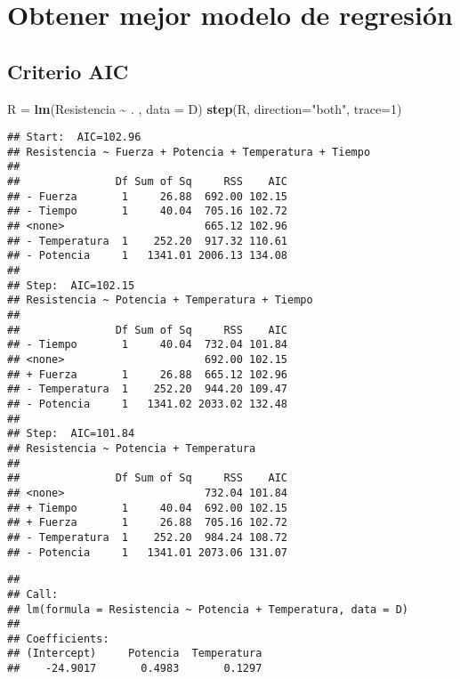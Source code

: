 \documentclass[
]{article}
\newenvironment{Shaded}{\begin{snugshade}}{\end{snugshade}}
\newcommand{\AttributeTok}[1]{\textcolor[rgb]{0.13,0.29,0.53}{#1}}
\newcommand{\DecValTok}[1]{\textcolor[rgb]{0.00,0.00,0.81}{#1}}
\newcommand{\FunctionTok}[1]{\textcolor[rgb]{0.13,0.29,0.53}{\textbf{#1}}}
\newcommand{\NormalTok}[1]{#1}
\newcommand{\OtherTok}[1]{\textcolor[rgb]{0.56,0.35,0.01}{#1}}
\newcommand{\SpecialCharTok}[1]{\textcolor[rgb]{0.81,0.36,0.00}{\textbf{#1}}}
\newcommand{\StringTok}[1]{\textcolor[rgb]{0.31,0.60,0.02}{#1}}
\begin{document}
\section{Obtener mejor modelo de
regresión}\label{obtener-mejor-modelo-de-regresiuxf3n}

\subsection{Criterio AIC}\label{criterio-aic}

\begin{Shaded}
\begin{Highlighting}[]
\NormalTok{R }\OtherTok{=} \FunctionTok{lm}\NormalTok{(Resistencia }\SpecialCharTok{\textasciitilde{}}\NormalTok{ . , }\AttributeTok{data =}\NormalTok{ D)}
\FunctionTok{step}\NormalTok{(R, }\AttributeTok{direction=}\StringTok{"both"}\NormalTok{, }\AttributeTok{trace=}\DecValTok{1}\NormalTok{)}
\end{Highlighting}
\end{Shaded}

\begin{verbatim}
## Start:  AIC=102.96
## Resistencia ~ Fuerza + Potencia + Temperatura + Tiempo
## 
##               Df Sum of Sq     RSS    AIC
## - Fuerza       1     26.88  692.00 102.15
## - Tiempo       1     40.04  705.16 102.72
## <none>                      665.12 102.96
## - Temperatura  1    252.20  917.32 110.61
## - Potencia     1   1341.01 2006.13 134.08
## 
## Step:  AIC=102.15
## Resistencia ~ Potencia + Temperatura + Tiempo
## 
##               Df Sum of Sq     RSS    AIC
## - Tiempo       1     40.04  732.04 101.84
## <none>                      692.00 102.15
## + Fuerza       1     26.88  665.12 102.96
## - Temperatura  1    252.20  944.20 109.47
## - Potencia     1   1341.02 2033.02 132.48
## 
## Step:  AIC=101.84
## Resistencia ~ Potencia + Temperatura
## 
##               Df Sum of Sq     RSS    AIC
## <none>                      732.04 101.84
## + Tiempo       1     40.04  692.00 102.15
## + Fuerza       1     26.88  705.16 102.72
## - Temperatura  1    252.20  984.24 108.72
## - Potencia     1   1341.01 2073.06 131.07
\end{verbatim}

\begin{verbatim}
## 
## Call:
## lm(formula = Resistencia ~ Potencia + Temperatura, data = D)
## 
## Coefficients:
## (Intercept)     Potencia  Temperatura  
##    -24.9017       0.4983       0.1297
\end{verbatim}
\end{document}
